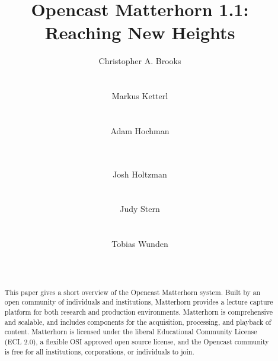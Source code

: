\documentclass{sig-alternate}
\begin{document}
\title{Opencast Matterhorn 1.1: Reaching New Heights}

\author{
%
\alignauthor
		Christopher A. Brooks \\
       \\
       \\
%
\alignauthor
		Markus Ketterl \titlenote{}\\
       \\
       \\
%
\alignauthor
		Adam Hochman\\
       \\
       \\
\and
%
\alignauthor
		Josh Holtzman\\
       \\
       \\
%
\alignauthor
		Judy Stern\\
       \\
       \\
%
\alignauthor
		Tobias Wunden\\
       \\
       \\
}


\maketitle
\begin{abstract}
This paper gives a short overview of the Opencast Matterhorn system.  Built by an open community of individuals and institutions, Matterhorn provides a lecture capture platform for both research and production environments.  Matterhorn is comprehensive and scalable, and includes components for the acquisition, processing, and playback of content.  Matterhorn is licensed under the liberal Educational Community License (ECL 2.0), a flexible OSI approved open source license, and the Opencast community is free for all institutions, corporations, or individuals to join.
\end{abstract}
\end{document}
